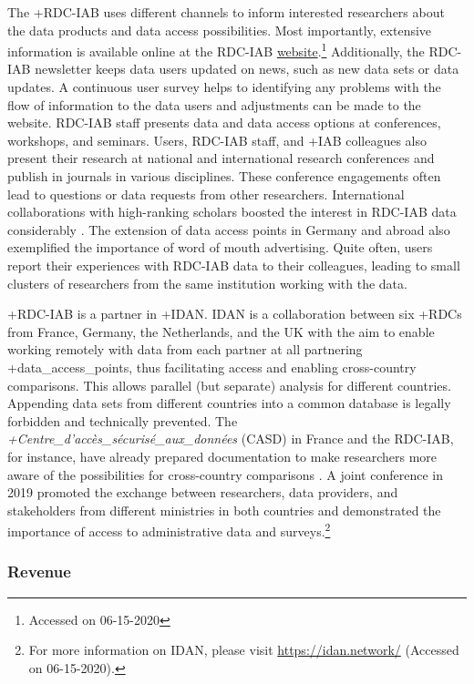 \documentclass[
]{WileySix}
\begin{document}
The +RDC-IAB\textbar{} uses different channels to inform interested researchers about the data products and data access possibilities. Most importantly, extensive information is available online at the RDC-IAB \href{https://fdz.iab.de/en.aspx}{website}.\footnote{Accessed on 06-15-2020} Additionally, the RDC-IAB newsletter keeps data users updated on news, such as new data sets or data updates. A continuous user survey helps to identifying any problems with the flow of information to the data users and adjustments can be made to the website. RDC-IAB staff presents data and data access options at conferences, workshops, and seminars. Users, RDC-IAB staff, and +IAB\textbar{} colleagues also present their research at national and international research conferences and publish in journals in various disciplines. These conference engagements often lead to questions or data requests from other researchers. International collaborations with high-ranking scholars boosted the interest in RDC-IAB data considerably \citep{card2015, schmieder2016}. The extension of data access points in Germany and abroad also exemplified the importance of word of mouth advertising. Quite often, users report their experiences with RDC-IAB data to their colleagues, leading to small clusters of researchers from the same institution working with the data.

+RDC-IAB\textbar{} is a partner in +IDAN\textbar. IDAN is a collaboration between six +RDC\textbar s from France, Germany, the Netherlands, and the UK with the aim to enable working remotely with data from each partner at all partnering +data\_access\_points\textbar, thus facilitating access and enabling cross-country comparisons. This allows parallel (but separate) analysis for different countries. Appending data sets from different countries into a common database is legally forbidden and technically prevented. The \emph{+Centre\_d'accès\_sécurisé\_aux\_données\textbar{}} (CASD) in France and the RDC-IAB, for instance, have already prepared documentation to make researchers more aware of the possibilities for cross-country comparisons \citep{laible2020}. A joint conference in 2019 promoted the exchange between researchers, data providers, and stakeholders from different ministries in both countries and demonstrated the importance of access to administrative data and surveys.\footnote{For more information on IDAN, please visit \url{https://idan.network/} (Accessed on 06-15-2020).}

\hypertarget{revenue}{%
\subsubsection{Revenue}\label{revenue}}
\end{document}
